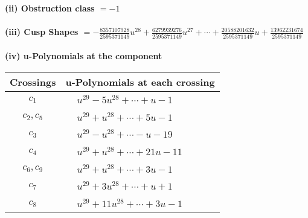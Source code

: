 \documentclass[1p]{elsarticle_modified}
\theoremstyle{definition}
\begin{document}
\flushleft \textbf{(ii) Obstruction class $= -1$}\\~\\
\flushleft \textbf{(iii) Cusp Shapes $= -\frac{8357107928}{2595371149} u^{28}+\frac{6279939276}{2595371149} u^{27}+\cdots+\frac{20588201632}{2595371149} u+\frac{13962231674}{2595371149}$}\\~\\
\newpage\renewcommand{\arraystretch}{1}
\flushleft \textbf{(iv) u-Polynomials at the component}\newline \\
\begin{tabular}{m{50pt}|m{274pt}}
Crossings & \hspace{64pt}u-Polynomials at each crossing \\
\hline $$\begin{aligned}c_{1}\end{aligned}$$&$\begin{aligned}
&u^{29}-5 u^{28}+\cdots+u-1
\end{aligned}$\\
\hline $$\begin{aligned}c_{2},c_{5}\end{aligned}$$&$\begin{aligned}
&u^{29}+u^{28}+\cdots+5 u-1
\end{aligned}$\\
\hline $$\begin{aligned}c_{3}\end{aligned}$$&$\begin{aligned}
&u^{29}- u^{28}+\cdots- u-19
\end{aligned}$\\
\hline $$\begin{aligned}c_{4}\end{aligned}$$&$\begin{aligned}
&u^{29}+u^{28}+\cdots+21 u-11
\end{aligned}$\\
\hline $$\begin{aligned}c_{6},c_{9}\end{aligned}$$&$\begin{aligned}
&u^{29}+u^{28}+\cdots+3 u-1
\end{aligned}$\\
\hline $$\begin{aligned}c_{7}\end{aligned}$$&$\begin{aligned}
&u^{29}+3 u^{28}+\cdots+u+1
\end{aligned}$\\
\hline $$\begin{aligned}c_{8}\end{aligned}$$&$\begin{aligned}
&u^{29}+11 u^{28}+\cdots+3 u-1
\end{aligned}$\\
\hline
\end{tabular}\\~\\
\end{document}
